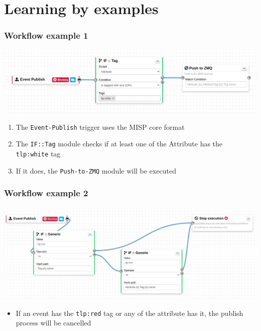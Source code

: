 \section{Learning by examples}
\begin{frame}
    \frametitle{Workflow example 1}
    \begin{center}
        \includegraphics[width=1.0\linewidth]{pictures/example-1a.png}
    \end{center}

    \begin{enumerate}
        \item The \texttt{Event-Publish} trigger uses the MISP core format
        \item The \texttt{IF::Tag} module checks if at least one of the Attribute has the \texttt{tlp:white} tag
        \item If it does, the \texttt{Push-to-ZMQ} module will be executed
    \end{enumerate}
\end{frame}

\begin{frame}
    \frametitle{Workflow example 2}
    \begin{center}
        \includegraphics[width=1.0\linewidth]{pictures/example-2a.png}
    \end{center}

    \begin{itemize}
        \item If an event has the \texttt{tlp:red} tag or any of the attribute has it, the publish process will be cancelled
    \end{itemize}
\end{frame}



